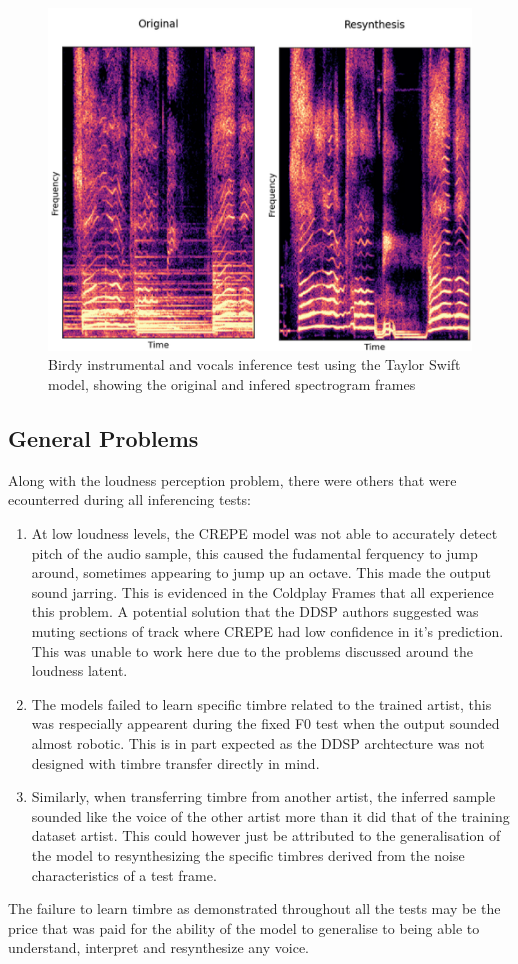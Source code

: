 \begin{figure}[H]
    \centering
    \includegraphics[width=\textwidth]{research/results/Birdy/InferenceWithInstrumentals.png}
    \caption{Birdy instrumental and vocals inference test using the Taylor Swift model, showing the original and infered spectrogram frames}
\end{figure}

\subsection{General Problems}

Along with the loudness perception problem, there were others that were ecounterred during all inferencing tests:

\begin{enumerate}
    \item At low loudness levels, the CREPE model was not able to accurately detect pitch of the audio sample, this caused the fudamental ferquency to jump around, sometimes appearing to jump up an octave. This made the output sound jarring. This is evidenced in the Coldplay Frames that all experience this problem. A potential solution that the DDSP authors suggested was muting sections of track where CREPE had low confidence in it's prediction. This was unable to work here due to the problems discussed around the loudness latent.
    \item The models failed to learn specific timbre related to the trained artist, this was respecially appearent during the fixed F0 test when the output sounded almost robotic. This is in part expected as the DDSP archtecture was not designed with timbre transfer directly in mind.
    \item Similarly, when transferring timbre from another artist, the inferred sample sounded like the voice of the other artist more than it did that of the training dataset artist. This could however just be attributed to the generalisation of the model to resynthesizing the specific timbres derived from the noise characteristics of a test frame.
\end{enumerate}

The failure to learn timbre as demonstrated throughout all the tests may be the price that was paid for the ability of the model to generalise to being able to understand, interpret and resynthesize any voice.